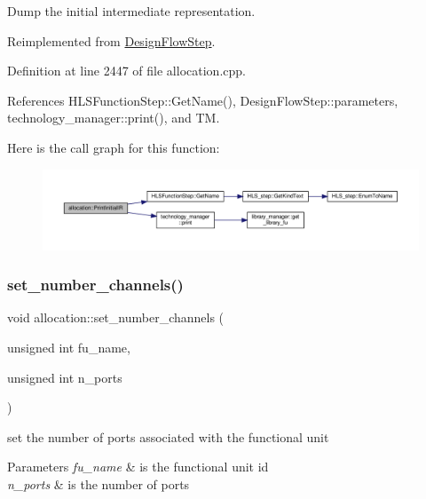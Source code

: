 Dump the initial intermediate representation. 



Reimplemented from \hyperlink{classDesignFlowStep_a2a169bd0ac5fe3cd5179871714cbe1ab}{Design\+Flow\+Step}.



Definition at line 2447 of file allocation.\+cpp.



References H\+L\+S\+Function\+Step\+::\+Get\+Name(), Design\+Flow\+Step\+::parameters, technology\+\_\+manager\+::print(), and TM.

Here is the call graph for this function\+:
\nopagebreak
\begin{figure}[H]
\begin{center}
\leavevmode
\includegraphics[width=350pt]{d0/d74/classallocation_aa977c26d2952e7fc0e7f09037c540bd3_cgraph}
\end{center}
\end{figure}
\mbox{\label{classallocation_a6f4d2a8b3457f7ff1751b08154dfa0b7}} 
\subsubsection{\texorpdfstring{set\+\_\+number\+\_\+channels()}{set\_number\_channels()}}
{\footnotesize\ttfamily void allocation\+::set\+\_\+number\+\_\+channels (\begin{DoxyParamCaption}\item[{unsigned int}]{fu\+\_\+name,  }\item[{unsigned int}]{n\+\_\+ports }\end{DoxyParamCaption})\hspace{0.3cm}{\ttfamily [protected]}}



set the number of ports associated with the functional unit 


\begin{DoxyParams}{Parameters}
{\em fu\+\_\+name} & is the functional unit id \\
\hline
{\em n\+\_\+ports} & is the number of ports \\
\hline
\end{DoxyParams}


